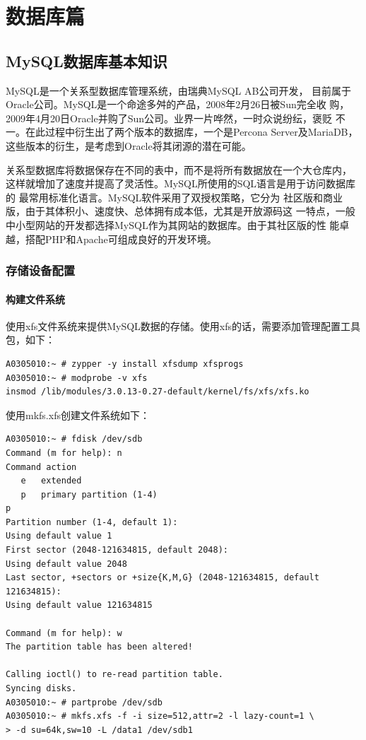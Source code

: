 \part{数据库篇}
\chapter{MySQL数据库基本知识}

MySQL是一个关系型数据库管理系统，由瑞典MySQL AB公司开发，
目前属于Oracle公司。MySQL是一个命途多舛的产品，2008年2月26日被Sun完全收
购，2009年4月20日Oracle并购了Sun公司。业界一片哗然，一时众说纷纭，褒贬
不一。在此过程中衍生出了两个版本的数据库，一个是Percona
Server及MariaDB，这些版本的衍生，是考虑到Oracle将其闭源的潜在可能。

关系型数据库将数据保存在不同的表中，而不是将所有数据放在一个大仓库内，
这样就增加了速度并提高了灵活性。MySQL所使用的SQL语言是用于访问数据库的
最常用标准化语言。MySQL软件采用了双授权策略，它分为
社区版和商业版，由于其体积小、速度快、总体拥有成本低，尤其是开放源码这
一特点，一般中小型网站的开发都选择MySQL作为其网站的数据库。由于其社区版的性
能卓越，搭配PHP和Apache可组成良好的开发环境。

\section{存储设备配置}

\subsection{构建文件系统}

使用xfs文件系统来提供MySQL数据的存储。使用xfs的话，需要添加管理配置工具
包，如下：

\begin{verbatim}
A0305010:~ # zypper -y install xfsdump xfsprogs   
A0305010:~ # modprobe -v xfs 
insmod /lib/modules/3.0.13-0.27-default/kernel/fs/xfs/xfs.ko
\end{verbatim}

使用mkfs.xfs创建文件系统如下：

\begin{verbatim}
A0305010:~ # fdisk /dev/sdb
Command (m for help): n
Command action
   e   extended
   p   primary partition (1-4)
p
Partition number (1-4, default 1): 
Using default value 1
First sector (2048-121634815, default 2048): 
Using default value 2048
Last sector, +sectors or +size{K,M,G} (2048-121634815, default 121634815): 
Using default value 121634815

Command (m for help): w
The partition table has been altered!

Calling ioctl() to re-read partition table.
Syncing disks.
A0305010:~ # partprobe /dev/sdb
A0305010:~ # mkfs.xfs -f -i size=512,attr=2 -l lazy-count=1 \
> -d su=64k,sw=10 -L /data1 /dev/sdb1
\end{verbatim}

